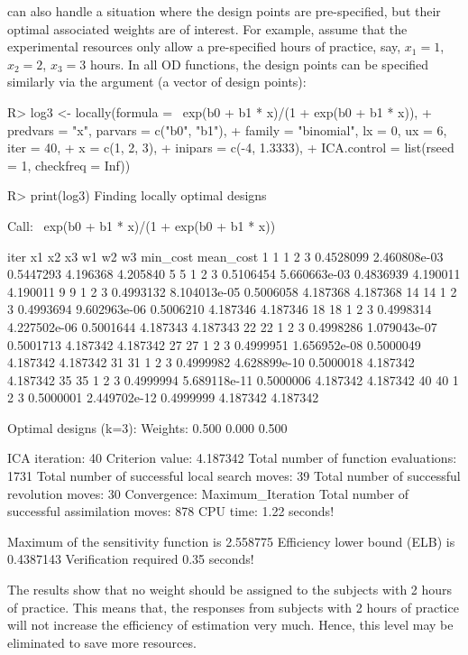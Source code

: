  can also handle a situation where the design points are pre-specified, but their optimal associated weights are of interest.
For example,  assume that the experimental  resources only allow a pre-specified hours of practice, say,   $x_1 = 1$, $x_2 = 2$, $x_3 = 3$ hours. In all OD functions, the design points can be specified  similarly via the argument  (a vector of design points):
  \begin{example}
R> log3 <- locally(formula = ~exp(b0 + b1 * x)/(1 + exp(b0 + b1 * x)),
+                 predvars = "x", parvars = c("b0", "b1"),
+                 family = "binomial", lx = 0, ux = 6, iter = 40,
+                 x = c(1, 2, 3),
+                 inipars = c(-4, 1.3333),
+                 ICA.control = list(rseed = 1, checkfreq = Inf))

R> print(log3)
Finding  locally optimal designs

Call:
  ~exp(b0 + b1 * x)/(1 + exp(b0 + b1 * x))

iter x1 x2 x3        w1           w2        w3 min_cost mean_cost
1     1  1  2  3 0.4528099 2.460808e-03 0.5447293 4.196368  4.205840
5     5  1  2  3 0.5106454 5.660663e-03 0.4836939 4.190011  4.190011
9     9  1  2  3 0.4993132 8.104013e-05 0.5006058 4.187368  4.187368
14   14  1  2  3 0.4993694 9.602963e-06 0.5006210 4.187346  4.187346
18   18  1  2  3 0.4998314 4.227502e-06 0.5001644 4.187343  4.187343
22   22  1  2  3 0.4998286 1.079043e-07 0.5001713 4.187342  4.187342
27   27  1  2  3 0.4999951 1.656952e-08 0.5000049 4.187342  4.187342
31   31  1  2  3 0.4999982 4.628899e-10 0.5000018 4.187342  4.187342
35   35  1  2  3 0.4999994 5.689118e-11 0.5000006 4.187342  4.187342
40   40  1  2  3 0.5000001 2.449702e-12 0.4999999 4.187342  4.187342

Optimal designs (k=3):
  Weights: 0.500 0.000 0.500

ICA iteration: 40
Criterion value:  4.187342
Total number of function evaluations: 1731
Total number of successful local search moves: 39
Total number of successful revolution moves: 30
Convergence: Maximum_Iteration
Total number of successful assimilation moves: 878
CPU time: 1.22  seconds!
  
  Maximum of the sensitivity function is  2.558775
Efficiency lower bound (ELB) is  0.4387143
Verification required 0.35 seconds!
  \end{example}
The results show that  no weight should be assigned to the subjects with 2 hours of practice. This means that, the responses from subjects with 2 hours of practice  will not increase  the efficiency of estimation very much. Hence, this level may be eliminated  to save more resources.

